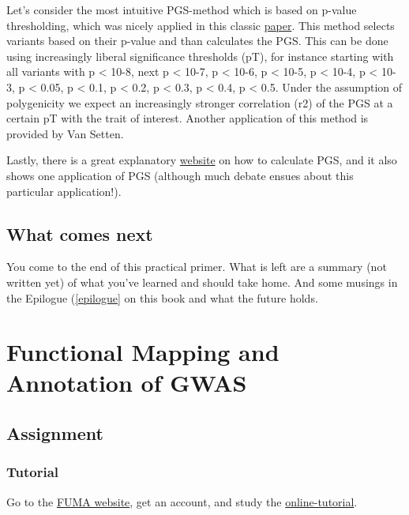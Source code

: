 \documentclass[
]{book}
\begin{document}
Let's consider the most intuitive PGS-method which is based on p-value thresholding, which was nicely applied in this classic \href{https://doi.org/10.1038/nature08185}{paper}. This method selects variants based on their p-value and than calculates the PGS. This can be done using increasingly liberal significance thresholds (pT), for instance starting with all variants with p \textless{} 10-8, next p \textless{} 10-7, p \textless{} 10-6, p \textless{} 10-5, p \textless{} 10-4, p \textless{} 10-3, p \textless{} 0.05, p \textless{} 0.1, p \textless{} 0.2, p \textless{} 0.3, p \textless{} 0.4, p \textless{} 0.5. Under the assumption of polygenicity we expect an increasingly stronger correlation (r2) of the PGS at a certain pT with the trait of interest. Another application of this method is provided by Van Setten\citep{vansetten2015}.

Lastly, there is a great explanatory \href{http://polygenicscores.org/explained/}{website} on how to calculate PGS, and it also shows one application of PGS (although much debate ensues about this particular application!).

\hypertarget{what-comes-next}{%
\section{What comes next}\label{what-comes-next}}

You come to the end of this practical primer. What is left are a summary (not written yet) of what you've learned and should take home. And some musings in the Epilogue (\ref{epilogue} on this book and what the future holds.

\hypertarget{fuma}{%
\chapter{Functional Mapping and Annotation of GWAS}\label{fuma}}

\hypertarget{assignment-1}{%
\section{Assignment}\label{assignment-1}}

\hypertarget{tutorial}{%
\subsection{Tutorial}\label{tutorial}}

Go to the \href{https://fuma.ctglab.nl}{FUMA website}, get an account, and study the \href{https://fuma.ctglab.nl/tutorial}{online-tutorial}.
\end{document}
